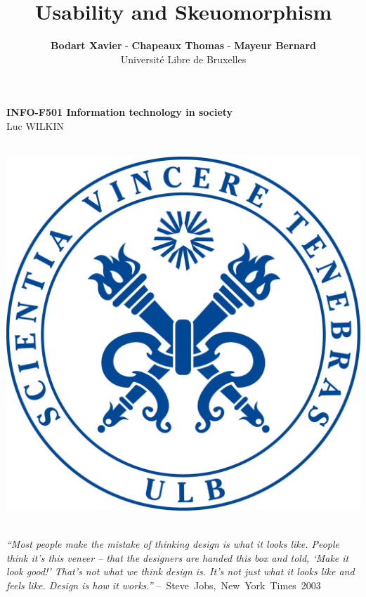 \documentclass[a4paper,11pt] {article}
\theoremstyle{definition}
\begin{document}
\title{\textbf{Usability and Skeuomorphism}}
\author{\textbf{Bodart Xavier} - \textbf{Chapeaux Thomas} - \textbf{Mayeur Bernard} \\
Université Libre de Bruxelles}

\maketitle
\begin{center}

\textbf{INFO-F501 Information technology in society} \\
Luc WILKIN
\end{center}
\begin{center}

~\\

\includegraphics[scale=0.15]{fig-report/ULBjea.jpg}

~\\

\textit{“Most people make the mistake of thinking design is what it looks like. People think it’s this veneer – that the designers are handed this box and told, ‘Make it look good!’ That’s not what we think design is. It’s not just what it looks like and feels like. Design is how it works.”} \mbox{– Steve Jobs, New York Times 2003}

\end{center}
\end{document}
